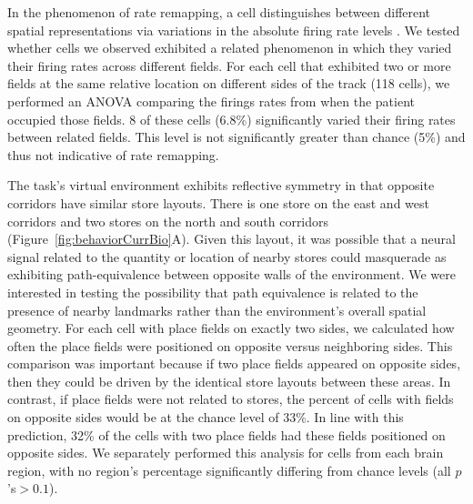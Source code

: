 In the phenomenon of rate remapping, a cell distinguishes between different spatial representations via variations in the absolute firing rate levels  \cite{QuirEtal92,LeutEtal05,SingEtal10,AlleEtal12}.  We tested whether cells we observed exhibited a related phenomenon in which they varied their firing rates across different fields.  For each cell that exhibited two or more fields at the same relative location on different sides of the track (118 cells), we performed an ANOVA comparing the firings rates from when the patient occupied those fields. 8 of these cells (6.8\%) significantly varied their firing rates between related fields. This level is not significantly greater than chance (5\%) and thus not indicative of rate remapping.

The task's virtual environment exhibits reflective symmetry in that opposite corridors have similar store layouts.  There is one store on the east and west corridors and two stores on the north and south corridors (Figure~\ref{fig:behaviorCurrBio}A).  Given this layout, it was possible that a neural signal related to the quantity or location of nearby stores could masquerade as exhibiting path-equivalence between opposite walls of the environment.  We were interested in testing the possibility that path equivalence is related to the presence of nearby landmarks rather than the environment's overall spatial geometry.  For each cell with place fields on exactly two sides, we calculated how often the place fields were positioned on opposite versus neighboring sides.  This comparison was important because if two place fields appeared on opposite sides, then they could be driven by the identical store layouts between these areas. In contrast, if place fields were not related to stores, the percent of cells with fields on opposite sides would be at the chance level of 33\%. In line with this prediction, 32\% of the cells with two place fields had these fields positioned on opposite sides. We separately performed this analysis for cells from each brain region, with no region's percentage significantly differing from chance levels (all $p$'s$ > 0.1$).


